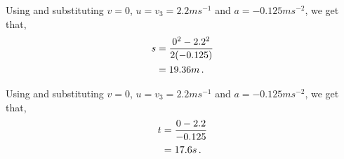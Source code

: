 \begin{subquestions}
\begin{subsubquestions}
Using  and substituting $v=0$, $u=v_3=2.2ms^{-1}$ and $a=-0.125ms^{-2}$, we get that,
\begin{align}
	s & = \frac{0^2-2.2^2}{2(-0.125)} \nonumber \\
	  & = 19.36m \,.
\end{align}

Using  and substituting $v=0$, $u=v_3=2.2ms^{-1}$ and $a=-0.125ms^{-2}$, we get that,
\begin{align}
	t & = \frac{0-2.2}{-0.125} \nonumber \\
	  & = 17.6s \,.
\end{align}







	
	
	
	
	
	
	
\end{subsubquestions}
	
\end{subquestions}